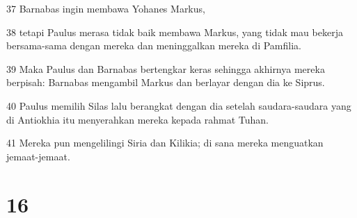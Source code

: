 \par 37 Barnabas ingin membawa Yohanes Markus,
\par 38 tetapi Paulus merasa tidak baik membawa Markus, yang tidak mau bekerja bersama-sama dengan mereka dan meninggalkan mereka di Pamfilia.
\par 39 Maka Paulus dan Barnabas bertengkar keras sehingga akhirnya mereka berpisah: Barnabas mengambil Markus dan berlayar dengan dia ke Siprus.
\par 40 Paulus memilih Silas lalu berangkat dengan dia setelah saudara-saudara yang di Antiokhia itu menyerahkan mereka kepada rahmat Tuhan.
\par 41 Mereka pun mengelilingi Siria dan Kilikia; di sana mereka menguatkan jemaat-jemaat.

\chapter{16}

